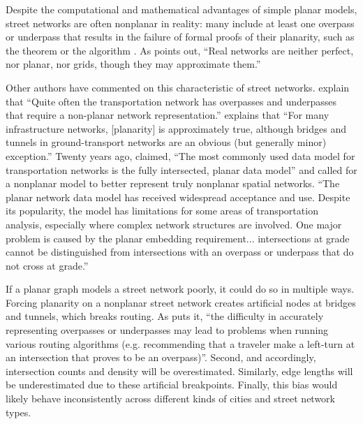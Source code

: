 \documentclass[Afour,sageh,times]{sagej}
\begin{document}
Despite the computational and mathematical advantages of simple planar models, street networks are often nonplanar in reality: many include at least one overpass or underpass that results in the failure of formal proofs of their planarity, such as the \citet{kuratowski_sur_1930} theorem or the \cite{hopcroft_efficient_1974} algorithm \citep[cf.][]{gastner_spatial_2006}. As \citet[p.~7]{levinson_network_2012} points out, \enquote{Real networks are neither perfect, nor planar, nor grids, though they may approximate them.}

Other authors have commented on this characteristic of street networks. \citet[p.~199]{jiang_object-oriented_2010} explain that \enquote{Quite often the transportation network has overpasses and underpasses that require a non-planar network representation.} \citet[p.~1258]{fischer_spatial_2014} explains that \enquote{For many infrastructure networks, {[planarity]} is approximately true, although bridges and tunnels in ground-transport networks are an obvious (but generally minor) exception.} Twenty years ago, \citep[p.~18]{fohl_non-planar_1996} claimed, \enquote{The most commonly used data model for transportation networks is the fully intersected, planar data model} and called for a nonplanar model to better represent truly nonplanar spatial networks. \enquote{The planar network data model has received widespread acceptance and use. Despite its popularity, the model has limitations for some areas of transportation analysis, especially where complex network structures are involved. One major problem is caused by the planar embedding requirement... intersections at grade cannot be distinguished from intersections with an overpass or underpass that do not cross at grade.} \citep[p.~395]{fischer_gis_2004} 

If a planar graph models a street network poorly, it could do so in multiple ways. Forcing planarity on a nonplanar street network creates artificial nodes at bridges and tunnels, which breaks routing. As \citet[p.~6]{kwan_review_1996} puts it, \enquote{the difficulty in accurately representing overpasses or underpasses may lead to problems when running various routing algorithms (e.g. recommending that a traveler make a left-turn at an intersection that proves to be an overpass)}. Second, and accordingly, intersection counts and density will be overestimated. Similarly, edge lengths will be underestimated due to these artificial breakpoints. Finally, this bias would likely behave inconsistently across different kinds of cities and street network types.
\end{document}
